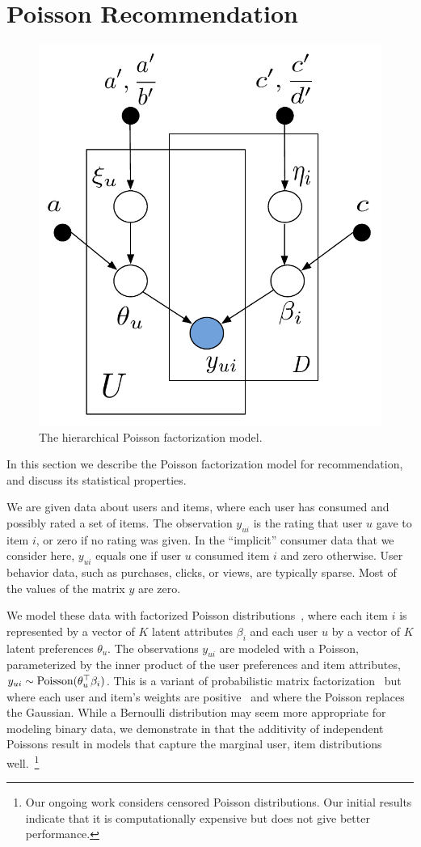 \section{Poisson Recommendation}
\label{sec:model}

\begin{figure}[t]
\begin{center}
\includegraphics[width=0.5\columnwidth]{figures/hpf.pdf}
\caption{\small{The hierarchical Poisson factorization model.}}
\label{fig:hpf}
\end{center}
\end{figure}


In this section we describe the Poisson factorization model for
recommendation, and discuss its statistical properties.

We are given data about users and items, where each user has consumed
and possibly rated a set of items.  The observation $y_{ui}$ is the
rating that user $u$ gave to item $i$, or zero if no rating was given.
In the ``implicit'' consumer data that we consider here, $y_{ui}$
equals one if user $u$ consumed item $i$ and zero otherwise.  User
behavior data, such as purchases, clicks, or views, are typically
sparse.  Most of the values of the matrix $y$ are zero.

We model these data with factorized Poisson
distributions~\cite{Canny:2004}, where each item $i$ is represented by
a vector of $K$ latent attributes $\beta_i$ and each user $u$ by a
vector of $K$ latent preferences $\theta_u$.  The observations $y_{ui}$
are modeled with a Poisson, parameterized by the inner product of
the user preferences and item attributes, $y_{ui} \sim
\textrm{Poisson}(\theta_u^\top \beta_i)$.  This is a variant of probabilistic
matrix factorization~\cite{Salakhutdinov:2008a} but where each user
and item's weights are positive~\cite{Lee:1999} and where the Poisson
replaces the Gaussian.
While a Bernoulli distribution may seem more appropriate for modeling
binary data, we demonstrate in  that the additivity
of independent Poissons result in models that capture the marginal
user, item distributions well.~\footnote{Our ongoing work considers
  censored Poisson distributions. Our initial results indicate that it
  is computationally expensive but does not give better performance.}

